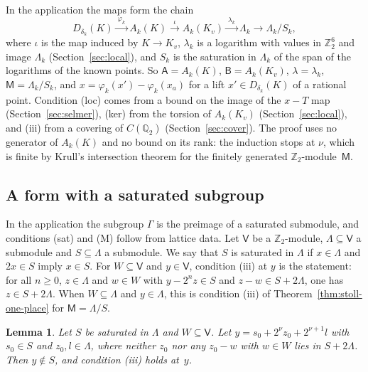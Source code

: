 \documentclass[11pt]{amsart}
\newtheorem{lemma}[theorem]{Lemma}
\theoremstyle{definition}
\numberwithin{equation}{section}
\newcommand{\Qt}{\mathbb{Q}_2}
\newcommand{\Zt}{\mathbb{Z}_2}
\newcommand{\kv}{K_v}
\newcommand{\lean}[1]{\ignorespaces}
\begin{document}
In the application the maps form the chain
\begin{equation}\label{eq:chain}
D_{\delta_k}(K)\xrightarrow{\ \varphi_k\ }A_k(K)\xrightarrow{\ \iota\ }A_k(\kv)\xrightarrow{\ \lambda_k\ }\Lambda_k\longrightarrow\Lambda_k/S_k ,
\end{equation}
where $\iota$ is the map induced by $K\to\kv$, $\lambda_k$ is a logarithm with values in $\Zt^6$ and image $\Lambda_k$ (Section~\ref{sec:local}), and $S_k$ is the saturation in $\Lambda_k$ of the span of the logarithms of the known points. So $\mathsf A=A_k(K)$, $\mathsf B=A_k(\kv)$, $\lambda=\lambda_k$, $\mathsf M=\Lambda_k/S_k$, and $x=\varphi_k(x')-\varphi_k(x_a)$ for a lift $x'\in D_{\delta_k}(K)$ of a rational point. Condition (loc) comes from a bound on the image of the $x-T$ map (Section~\ref{sec:selmer}), (ker) from the torsion of $A_k(\kv)$ (Section~\ref{sec:local}), and (iii) from a covering of $C(\Qt)$ (Section~\ref{sec:cover}). The proof uses no generator of $A_k(K)$ and no bound on its rank: the induction stops at $\nu$, which is finite by Krull's intersection theorem for the finitely generated $\Zt$-module~$\mathsf M$.

\subsection{A form with a saturated subgroup}
In the application the subgroup $\Gamma$ is the preimage of a saturated submodule, and conditions (sat) and (M) follow from lattice data. Let $\mathsf V$ be a $\Zt$-module, $\Lambda\subseteq\mathsf V$ a submodule and $S\subseteq\Lambda$ a submodule. We say that $S$ is saturated in $\Lambda$ if $x\in\Lambda$ and $2x\in S$ imply $x\in S$. For $W\subseteq\mathsf V$ and $y\in\mathsf V$, condition (iii) at $y$ is the statement: for all $n\ge0$, $z\in\Lambda$ and $w\in W$ with $y-2^nz\in S$ and $z-w\in S+2\Lambda$, one has $z\in S+2\Lambda$. When $W\subseteq\Lambda$ and $y\in\Lambda$, this is condition (iii) of Theorem~\ref{thm:stoll-one-place} for $\mathsf M=\Lambda/S$.

\begin{lemma}\label{lem:leading-class}\lean{FurioLombardo.M4.condIII_of_leading, FurioLombardo.M4.not_mem_of_leading}
Let $S$ be saturated in $\Lambda$ and $W\subseteq\mathsf V$. Let $y=s_0+2^\nu z_0+2^{\nu+1}l$ with $s_0\in S$ and $z_0,l\in\Lambda$, where neither $z_0$ nor any $z_0-w$ with $w\in W$ lies in $S+2\Lambda$. Then $y\notin S$, and condition (iii) holds at~$y$.
\end{lemma}
\end{document}
